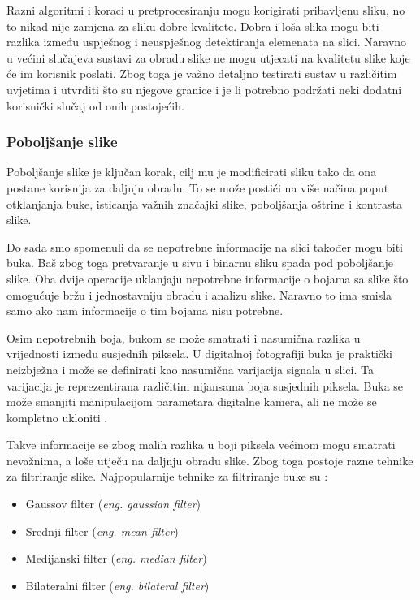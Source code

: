 \documentclass{foi}
\begin{document}
Razni algoritmi i koraci u pretprocesiranju mogu korigirati pribavljenu sliku, no to nikad nije zamjena za sliku dobre kvalitete. Dobra i loša slika mogu biti razlika između uspješnog i neuspješnog detektiranja elemenata na slici. Naravno u većini slučajeva sustavi za obradu slike ne mogu utjecati na kvalitetu slike koje će im korisnik poslati. Zbog toga je važno detaljno testirati sustav u različitim uvjetima i utvrditi što su njegove granice i je li potrebno podržati neki dodatni korisnički slučaj od onih postojećih.
\subsubsection{Poboljšanje slike}

Poboljšanje slike je ključan korak, cilj mu je modificirati sliku tako da ona postane korisnija za daljnju obradu. To se može postići na više načina poput otklanjanja buke, isticanja važnih značajki slike, poboljšanja oštrine i kontrasta slike.

Do sada smo spomenuli da se nepotrebne informacije na slici također mogu biti buka. Baš zbog toga pretvaranje u sivu i binarnu sliku spada pod poboljšanje slike. Oba dvije operacije uklanjaju nepotrebne informacije o bojama sa slike što omogućuje bržu i jednostavniju obradu i analizu slike. Naravno to ima smisla samo ako nam informacije o tim bojama nisu potrebne.

Osim nepotrebnih boja, bukom se može smatrati i nasumična razlika u vrijednosti između susjednih piksela. U digitalnoj fotografiji buka je praktički neizbježna i može se definirati kao nasumična varijacija signala u slici. Ta varijacija je reprezentirana različitim nijansama boja susjednih piksela. Buka se može smanjiti manipulacijom parametara digitalne kamera, ali ne može se kompletno ukloniti \cite{Adobe}.

Takve informacije se zbog malih razlika u boji piksela većinom mogu smatrati nevažnima, a loše utječu na daljnju obradu slike. Zbog toga postoje razne tehnike za filtriranje slike. Najpopularnije tehnike za filtriranje buke su \cite{Swain2023Jul}:

\begin{itemize}
    \item Gaussov filter (\textit{eng. gaussian filter})
    \item Srednji filter (\textit{eng. mean filter})
    \item Medijanski filter (\textit{eng. median filter})
    \item Bilateralni filter (\textit{eng. bilateral filter})
\end{itemize}
\end{document}
